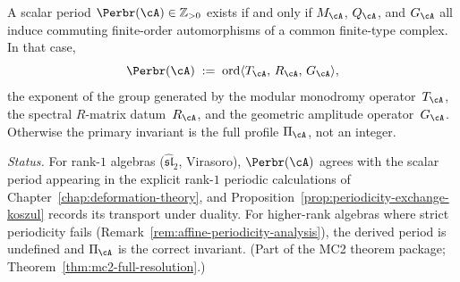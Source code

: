 \begin{definition}
\label{def:derived-scalar-period}
A scalar period $\Perbr(\cA) \in \mathbb{Z}_{>0}$ exists if and
only if $M_{\cA}$, $Q_{\cA}$, and $G_{\cA}$ all induce commuting
finite-order automorphisms of a common finite-type complex.
In that case,
\[
\Perbr(\cA)
\;:=\;
\operatorname{ord}\langle T_{\cA},\, R_{\cA},\, G_{\cA} \rangle,
\]
the exponent of the group generated by the modular monodromy
operator~$T_{\cA}$, the spectral $R$-matrix datum~$R_{\cA}$,
and the geometric amplitude operator~$G_{\cA}$.
Otherwise the primary invariant is the full profile
$\Pi_{\cA}$, not an integer.

\smallskip\noindent
\emph{Status.}
For rank-$1$ algebras ($\widehat{\mathfrak{sl}}_2$, Virasoro),
$\Perbr(\cA)$ agrees with the scalar period appearing in the explicit
rank-$1$ periodic calculations of
Chapter~\ref{chap:deformation-theory}, and
Proposition~\ref{prop:periodicity-exchange-koszul} records its transport
under duality.  For
higher-rank algebras where strict periodicity fails
(Remark~\ref{rem:affine-periodicity-analysis}), the derived
period is undefined and $\Pi_{\cA}$ is the correct invariant.
(Part of the MC2 theorem package; Theorem~\ref{thm:mc2-full-resolution}.)
\end{definition}

